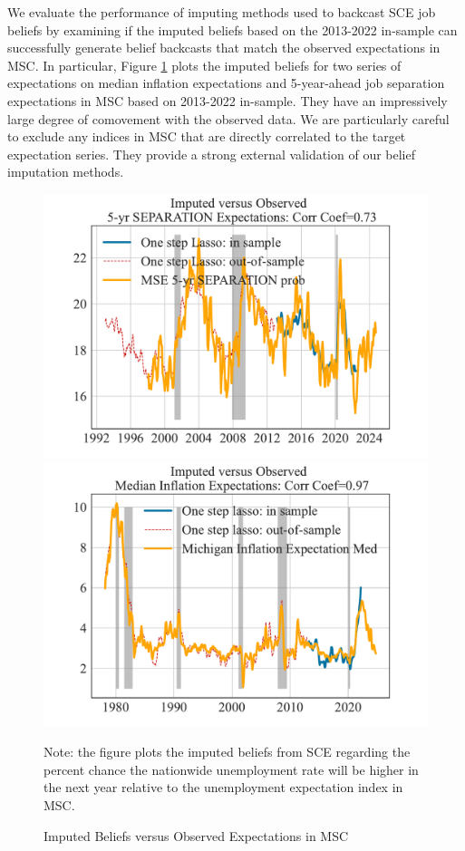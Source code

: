 We evaluate the performance of imputing methods used to backcast SCE job beliefs by examining if the imputed beliefs based on the 2013-2022 in-sample can successfully generate belief backcasts that match the observed expectations in MSC. In particular, Figure \ref{fig:impute_cv_with_msc_separation_inflation} plots the imputed beliefs for two series of expectations on median inflation expectations and 5-year-ahead job separation expectations in MSC based on 2013-2022 in-sample. They have an impressively large degree of comovement with the observed data. We are particularly careful to exclude any indices in MSC that are directly correlated to the target expectation series. They provide a strong external validation of our belief imputation methods. 

 \begin{figure}[ht]
    	\caption{Imputed Beliefs versus Observed Expectations in MSC}
    	\label{fig:impute_cv_with_msc_separation_inflation}
    	\begin{center}
\includegraphics[width=0.49\linewidth]{text/Chapter2/Figures/imputed_comparison_separation_5y_prob_msc_1step.pdf}  \includegraphics[width=0.49\linewidth]{text/Chapter2/Figures/imputed_comparison_inflation_msc_1step.pdf}  
    	\end{center}
    	
    	\begin{flushleft}Note: the figure plots the imputed beliefs from SCE regarding the percent chance the nationwide unemployment rate will be higher in the next year relative to the unemployment expectation index in MSC.\end{flushleft}
    \end{figure}



